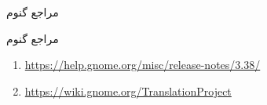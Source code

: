 \documentclass[hyperref={colorlinks}]{beamer}
\begin{document}
\begin{persian}
\begin{frame}{مراجع گنوم}
\begin{block}{مراجع گنوم}
\begin{latin}

\footnotesize{
\begin{enumerate}
\normalsize\raggedleft
\setlength{\itemsep}{-.1em}
\item \url{https://help.gnome.org/misc/release-notes/3.38/}
\item \url{https://wiki.gnome.org/TranslationProject}
\end{enumerate}
}
\end{latin}

\end{block}
\end{frame}
\end{persian}

\end{document}

